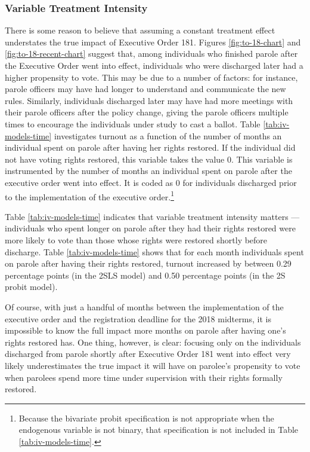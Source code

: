 \documentclass[
  12pt,
]{article}
\begin{document}
\hypertarget{variable-treatment-intensity}{%
\subsubsection*{Variable Treatment Intensity}\label{variable-treatment-intensity}}

There is some reason to believe that assuming a constant treatment effect understates the true impact of Executive Order 181. Figures \ref{fig:to-18-chart} and \ref{fig:to-18-recent-chart} suggest that, among individuals who finished parole after the Executive Order went into effect, individuals who were discharged later had a higher propensity to vote. This may be due to a number of factors: for instance, parole officers may have had longer to understand and communicate the new rules. Similarly, individuals discharged later may have had more meetings with their parole officers after the policy change, giving the parole officers multiple times to encourage the individuals under study to cast a ballot. Table \ref{tab:iv-models-time} investigates turnout as a function of the number of months an individual spent on parole after having her rights restored. If the individual did not have voting rights restored, this variable takes the value 0. This variable is instrumented by the number of months an individual spent on parole after the executive order went into effect. It is coded as 0 for individuals discharged prior to the implementation of the executive order.\footnote{Because the bivariate probit specification is not appropriate when the endogenous variable is not binary, that specification is not included in Table \ref{tab:iv-models-time}.}



Table \ref{tab:iv-models-time} indicates that variable treatment intensity matters --- individuals who spent longer on parole after they had their rights restored were more likely to vote than those whose rights were restored shortly before discharge. Table \ref{tab:iv-models-time} shows that for each month individuals spent on parole after having their rights restored, turnout increased by between 0.29 percentage points (in the 2SLS model) and 0.50 percentage points (in the 2S probit model).

Of course, with just a handful of months between the implementation of the executive order and the registration deadline for the 2018 midterms, it is impossible to know the full impact more months on parole after having one's rights restored has. One thing, however, is clear: focusing only on the individuals discharged from parole shortly after Executive Order 181 went into effect very likely underestimates the true impact it will have on parolee's propensity to vote when parolees spend more time under supervision with their rights formally restored.
\end{document}
